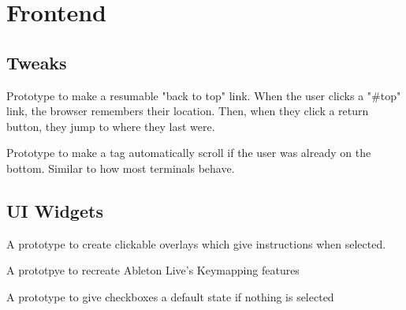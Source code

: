 \section{Frontend}

\subsection*{Tweaks}

{Prototype to make a resumable "back to top" link. When the user clicks a "\#top" link, the browser remembers their location.  Then, when they click a return button, they jump to where they last were.}

{Prototype to make a tag automatically scroll if the user was already on the bottom.  Similar to how most terminals behave.}

\newpage
\subsection*{UI Widgets}

{A prototype to create clickable overlays which give instructions when selected.}

{A prototpye to recreate Ableton Live's Keymapping features}

{A prototype to give checkboxes a default state if nothing is selected}
